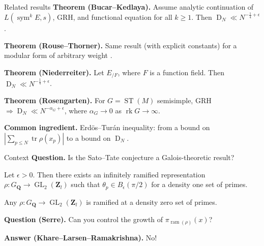\documentclass{beamer}
\DeclareMathOperator{\D}{D}
\DeclareMathOperator{\GL}{GL}
\DeclareMathOperator{\rk}{rk}
\DeclareMathOperator{\ram}{ram}
\DeclareMathOperator{\ST}{ST}
\DeclareMathOperator{\sym}{sym}
\DeclareMathOperator{\tr}{tr}
\newcommand{\bQ}{\mathbf{Q}}
\newcommand{\bZ}{\mathbf{Z}}
\begin{document}
\begin{frame}{Related results}
\textbf{Theorem (Bucar--Kedlaya).}
Assume analytic continuation of $L(\sym^k E,s)$, GRH, and functional equation 
for all $k\geqslant 1$. Then $\D_N \ll N^{-\frac 1 4+\epsilon}$. 
\pause

\textbf{Theorem (Rouse--Thorner).}
Same result (with explicit constants) for a modular form of arbitrary weight	. 
\pause

\textbf{Theorem (Niederreiter).}
Let $E_{/F}$, where $F$ is a function field. Then 
$\D_N \ll N^{-\frac 1 4+\epsilon}$. 
\pause

\textbf{Theorem (Rosengarten).}
For $G = \ST(M)$ semisimple, GRH $\Rightarrow\D_N \ll N^{-\alpha_G+\epsilon}$, 
where $\alpha_G\to 0$ as $\rk G\to \infty$. 
\pause

\textbf{Common ingredient.}
Erd\"os--Tur\'an inequality: from a bound on
$\left|\sum_{p\leqslant N} \tr \rho(x_p)\right|$ to a bound on $\D_N$.
\end{frame}



\begin{frame}{Context}
\textbf{Question.} 
Is the Sato--Tate conjecture a Galois-theoretic result?
\pause

\begin{theorem}[Pande]
Let $\epsilon>0$. Then there exists an infinitely ramified representation 
$\rho\colon G_\bQ \to \GL_2(\bZ_l)$ such that $\theta_p\in B_\epsilon(\pi/2)$ 
for a density one set of primes. 
\end{theorem}
\pause

\begin{theorem}
Any $\rho\colon G_\bQ \to \GL_2(\bZ_l)$ is ramified at a density zero set of 
primes. 
\end{theorem}
\pause

\textbf{Question (Serre).} Can you control the growth of 
$\pi_{\ram(\rho)}(x)$?
\pause

\textbf{Answer (Khare--Larsen--Ramakrishna).} No!
\end{frame}
\end{document}
